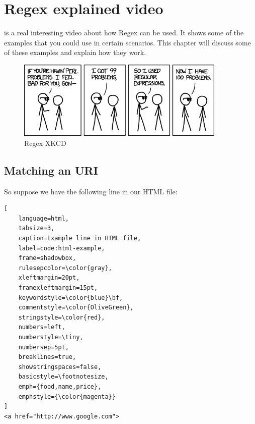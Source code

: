 \chapter{Regex explained video}
\label{chap:regex-explained}

\cite{regex-explained}  is a real interesting video about how Regex can be used. It shows some of the examples that you could use in certain scenarios. This chapter will discuss some of these examples and explain how they work.

\begin{figure}[ht]
\begin{center}
\includegraphics[width=10cm]{Chapters/04_perl_problems.png}
\end{center}
\caption{Regex XKCD\footnotemark}
\label{img:regex-xkcd}
\end{figure}


\section{Matching an URI}
\label{sec:matching-an-uri}
So suppose we have the following line in our HTML file:
\begin{lstlisting}[
	language=html,
	tabsize=3,
	caption=Example line in HTML file,
	label=code:html-example,
	frame=shadowbox,
	rulesepcolor=\color{gray},
	xleftmargin=20pt,
	framexleftmargin=15pt,
	keywordstyle=\color{blue}\bf,
	commentstyle=\color{OliveGreen},
	stringstyle=\color{red},
	numbers=left,
	numberstyle=\tiny,
	numbersep=5pt,
	breaklines=true,
	showstringspaces=false,
	basicstyle=\footnotesize,
	emph={food,name,price},
	emphstyle={\color{magenta}}
]
<a href="http://www.google.com">
\end{lstlisting}

